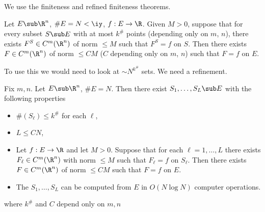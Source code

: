 We use the finiteness and refined finiteness theorems.
\begin{thm}
Let $E\sub \R^n$, $\#E=N<\iy$, $f:E\to \R$. Given $M>0$, suppose that for every subset $S\sub E$ with at most $k^\#$ points (depending only on $m$, $n$), there exists $F^S\in C^m(\R^n)$ of norm $\le M$ such that $F^S=f$ on $S$. Then there exists $F\in C^m(\R^n)$ of norm $\le C M$ ($C$ depending only on $m$, $n$) such that $F=f$ on $E$.
\end{thm}
To use this we would need to look at $\sim N^{k^\#}$ sets.  %
We need a refinement. 

\begin{thm}
Fix $m,n$. Let $E\sub \R^n$, $\#E = N$. Then there exist $S_1,\ldots ,S_L\sub E$ with the following properties
\begin{itemize}
\item
$\#(S_\ell)\le k^\#$ for each $\ell$,
\item
$L\le CN$,
\item
Let $f:E\to \R$ and let $M>0$. Suppose that for each $\ell=1,\ldots, L$ there exists $F_\ell\in C^m(\R^n)$ with norm $\le M$ such that $F_\ell=f$ on $S_\ell$. Then there exists $F\in C^m(\R^n)$ of norm $\le CM$ such that $F=f$ on $E$. 
\item
The $S_1,\ldots, S_L$ can be computed from $E$ in $O(N\log N)$ computer operations.
\end{itemize}
where $k^\#$ and $C$ depend only on $m,n$
\end{thm}

